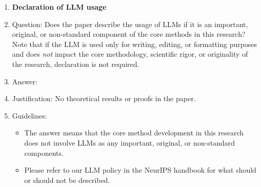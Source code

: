 \begin{enumerate}
\item {\bf Declaration of LLM usage}
    \item[] Question: Does the paper describe the usage of LLMs if it is an important, original, or non-standard component of the core methods in this research? Note that if the LLM is used only for writing, editing, or formatting purposes and does \emph{not} impact the core methodology, scientific rigor, or originality of the research, declaration is not required.
    \item[] Answer: \answerNA{}
    \item[] Justification: No theoretical results or proofs in the paper.
    \item[] Guidelines:
    \begin{itemize}
        \item The answer \answerNA{} means that the core method development in this research does not involve LLMs as any important, original, or non-standard components.
        \item Please refer to our LLM policy in the NeurIPS handbook for what should or should not be described.
    \end{itemize}

\end{enumerate}